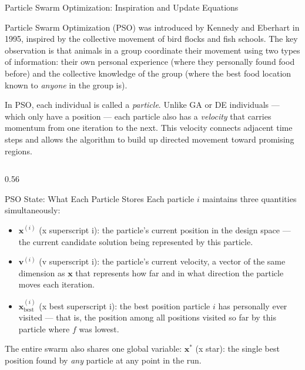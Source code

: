 \documentclass[aspectratio=169,10pt]{beamer}
\newcommand{\bx}{\mathbf{x}}
\newcommand{\bv}{\mathbf{v}}
\begin{document}
\begin{frame}[allowframebreaks]{Particle Swarm Optimization: Inspiration and Update Equations}

  Particle Swarm Optimization (PSO) was introduced by Kennedy and
  Eberhart in 1995, inspired by the collective movement of bird
  flocks and fish schools.  The key observation is that animals in
  a group coordinate their movement using two types of information:
  their own personal experience (where they personally found food
  before) and the collective knowledge of the group (where the best
  food location known to \emph{anyone} in the group is).

  In PSO, each individual is called a \emph{particle}.  Unlike GA
  or DE individuals --- which only have a position --- each particle
  also has a \emph{velocity} that carries momentum from one iteration
  to the next.  This velocity connects adjacent time steps and allows
  the algorithm to build up directed movement toward promising
  regions.

  \begin{columns}[T]
    \begin{column}{0.56\textwidth}
      \begin{block}{PSO State: What Each Particle Stores}
        Each particle $i$ maintains three quantities simultaneously:
        \begin{itemize}
          \item $\bx^{(i)}$ (x superscript i): the particle's current
                position in the design space --- the current candidate
                solution being represented by this particle.
          \item $\bv^{(i)}$ (v superscript i): the particle's current
                velocity, a vector of the same dimension as $\bx$
                that represents how far and in what direction the
                particle moves each iteration.
          \item $\bx^{(i)}_{\text{best}}$ (x best superscript i):
                the best position particle $i$ has personally ever
                visited --- that is, the position among all positions
                visited so far by this particle where $f$ was lowest.
        \end{itemize}
        The entire swarm also shares one global variable:
        $\bx^*$ (x star): the single best position found by
        \emph{any} particle at any point in the run.
      \end{block}


\end{column}
\end{columns}
\end{frame}
\end{document}
